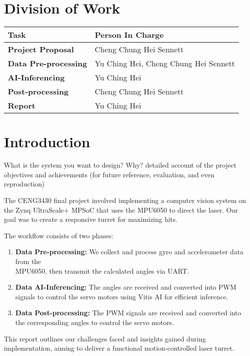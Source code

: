 \documentclass[12pt, a4paper]{article}
\begin{document}
\setcounter{page}{2}

\tableofcontents

\section*{Division of Work}
\begin{tabularx}{\textwidth}{|l||X|}
    \hline
    \textbf{Task} & \textbf{Person In Charge} \\
    \hline\hline
    \textbf{Project Proposal} & Cheng Chung Hei Sennett \\
    \hline
    \textbf{Data Pre-processing} & Yu Ching Hei, Cheng Chung Hei Sennett \\
    \hline
    \textbf{AI-Inferencing} & Yu Ching Hei \\
    \hline
    \textbf{Post-processing} & Cheng Chung Hei Sennett \\
    \hline
    \textbf{Report} & Yu Ching Hei \\
    \hline
\end{tabularx}

\newpage
{}
\setcounter{page}{1}

\section{Introduction}
What is the system you want to design? Why?
detailed account of the project objectives
and achievements (for future reference, evaluation, and even
reproduction)

The CENG3430 final project involved implementing a computer vision system on the Zynq UltraScale+ MPSoC \cite{zynq_ultrascale_swdev}
that uses the MPU6050 to direct the laser. Our goal was to create a responsive turret for maximizing hits.

\noindent The workflow consists of two phases:
\begin{enumerate}
    \item \textbf{Data Pre-processing:} We collect and process gyro and accelerometer 
          data from the \\MPU6050, then transmit the calculated angles via UART.
    \item \textbf{Data AI-Inferencing:} The angles are received and converted into PWM 
          signals to control the servo motors using Vitis AI \cite{vitis_ai_docs} for efficient inference.
    \item \textbf{Data Post-processing:} The PWM signals are received and converted into 
          the corresponding angles to control the servo motors.
\end{enumerate}
This report outlines our challenges faced and insights gained during implementation, aiming to deliver a functional motion-controlled laser turret.
\end{document}
